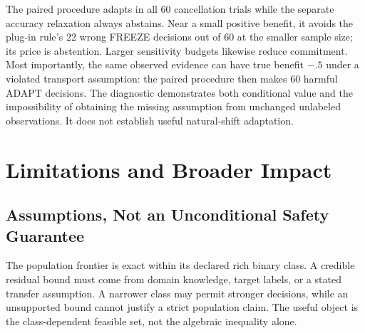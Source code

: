 \begin{table}[t]
\centering
\small
\caption{Selected diagnostic regimes from 4,860 synthetic trial configurations
(nine scenarios, three sample sizes, three sensitivity budgets, 60 trials each).
A/F/U count ADAPT/FREEZE/ABSTAIN over 60 trials. Separate subtracts accuracy
extrema on the same polytope; it is not an implementation of MaC-LP. The
same-evidence violation row deliberately violates the declared assumption and
reuses the paired-cancellation row's observable count streams. These archived
outputs retain the earlier numerical qualification described in
.}
\label{tab:nextphase-paired}
\resizebox{\textwidth}{!}{}
\end{table}

The paired procedure adapts in all 60 cancellation trials while the separate
accuracy relaxation always abstains. Near a small positive benefit, it avoids
the plug-in rule's 22 wrong FREEZE decisions out of 60 at the smaller sample
size; its price is abstention. Larger sensitivity budgets likewise reduce
commitment. Most importantly, the same observed evidence can have true benefit
$-.5$ under a violated transport assumption: the paired procedure then makes
60 harmful ADAPT decisions. The diagnostic demonstrates both conditional value
and the impossibility of obtaining the missing assumption from unchanged
unlabeled observations. It does not establish useful natural-shift adaptation.



\section{Limitations and Broader Impact}
\label{sec:compact-sensitivity}

\subsection{Assumptions, Not an Unconditional Safety Guarantee}

The population frontier is exact within its declared rich binary class. A credible residual bound
must come from domain knowledge, target labels, or a stated transfer assumption. A narrower class
may permit stronger decisions, while an unsupported bound cannot justify a strict population claim.
The useful object is the class-dependent feasible set, not the algebraic inequality alone.

